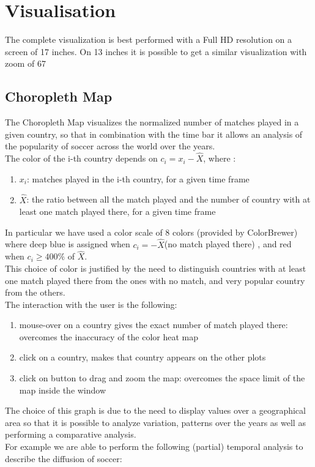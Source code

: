 \documentclass[journal]{vgtc}                %
\begin{document}
\section{Visualisation}
 The complete visualization is best performed with a Full HD resolution on a screen of 17 inches. On 13 inches it is possible to get a similar visualization with zoom of 67%
\subsection{Choropleth Map}
The Choropleth Map visualizes the normalized number of matches played in a given country, so that in combination with the time bar it allows an analysis of the popularity of soccer across the world over the years.\\The color of the i-th country depends on $c_i=x_i-\hat{X}$, where :
\begin{enumerate}
\item $x_i$: matches played in the i-th country, for a given time frame
\item $\hat{X}$: the ratio between all the match played and the number of country with at least one match played there, for a given time frame
\end{enumerate}
In particular we have used a color scale of 8 colors (provided by ColorBrewer) where deep blue is assigned when $c_i=-\hat{X}$(no match played there) , and red when $c_i\geq 400\%$ of $\hat{X}$.\\This choice of color is justified by the need to distinguish countries with at least one match played there from the ones with no match, and very popular country from the others.\\The interaction with the user is the following:
\begin{enumerate}
\item mouse-over on a country gives the exact number of match played there: overcomes the inaccuracy of the color heat map
\item click on a country, makes that country appears on the other plots
\item click on button to drag and zoom the map: overcomes the space limit of the map inside the window
\end{enumerate}
The choice of this graph is due to the need to display values over a geographical area so that it is possible to analyze variation, patterns over the years as well as performing a comparative analysis.\\For example we are able to perform the following (partial) temporal analysis to describe the diffusion of soccer:
\end{document}
